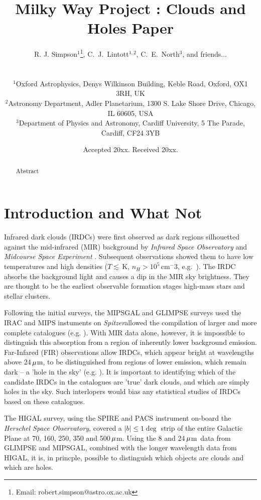 \documentclass[a4,useAMS,usenatbib]{mn2e}
\title{Milky Way Project : Clouds and Holes Paper}
\author[Simpson et al.]
{\parbox{\textwidth}{R. J. Simpson$^{1}$\thanks{Email: robert.simpson@astro.ox.ac.uk},
C.~J.~Lintott$^{1,2}$,
C.~E.~North$^3$,
and friends...}\vspace{0.8cm}\\
\parbox{\textwidth}{
$^{1}$Oxford Astrophysics, Denys Wilkinson Building, Keble Road, Oxford, OX1 3RH, UK \\
$^{2}$Astronomy Department, Adler Planetarium, 1300 S. Lake Shore Drive, Chicago, IL 60605, USA \\
$^{3}$Department of Physics and Astronomy, Cardiff University, 5 The Parade, Cardiff, CF24 3YB }}
\def\spitzer{{\em Spitzer}}
\def\mic{$\umu$m}
\begin{document}
\date{Accepted 20xx. Received 20xx.}

\pagerange{\pageref{firstpage}--\pageref{lastpage}} 

\maketitle

\label{firstpage}

\begin{abstract}
Abstract
\end{abstract}

\section{Introduction and What Not}
Infrared dark clouds (IRDCs) were first observed as dark regions
silhouetted against the mid-infrared (MIR) background
\citep{Wilcock2012a} by \emph{Infrared Space Observatory} \citep{ISO}
and \emph{Midcourse Space Experiment} \citep{ISO}. Subsequent
observations showed them to have low temperatures and high densities
($T\lesssim$\,K, $n_H > 10^5$\,cm$^-3$,
e.g.~\citet{Egan98,Carey98,HennebellePerault02}). The IRDC absorbs the
background light and causes a dip in the MIR sky brightness. They are
thought to be the earliest observable formation stages high-mass stars
and stellar clusters.

Following the initial surveys, the MIPSGAL and GLIMPSE surveys used
the IRAC and MIPS instuments on \spitzer allowed the compilation of
larger and more complete catalogues (e.g. \citet{PF09}). With MIR data
alone, however, it is impossible to distinguish this absorption from a
region of inherently lower background emission. Far-Infared (FIR)
observations allow IRDCs, which appear bright at wavelengths above
24\,\mic, to be distinguished from regions of lower emission, which
remain dark -- a 'hole in the sky'
(e.g. \citet{Stanke2010_NGC1999}). It is important to identifying
which of the candidate IRDCs in the catalogues are 'true' dark clouds,
and which are simply holes in the sky. Such interlopers would bias any
statistical studies of IRDCs based on these catalogues.

The HIGAL survey, using the SPIRE and PACS instrument on-board
the \emph{Herschel Space Observatory}, covered a $|b|\le 1\deg$ strip
of the entire Galactic Plane at 70, 160, 250, 350 and 500\,\mic. Using
the 8 and 24\,\mic\ data from GLIMPSE and MIPSGAL, combined with the
longer wavelength data from HIGAL, it is, in princple, possible to
distinguish which objects are clouds and which are holes.
\end{document}
